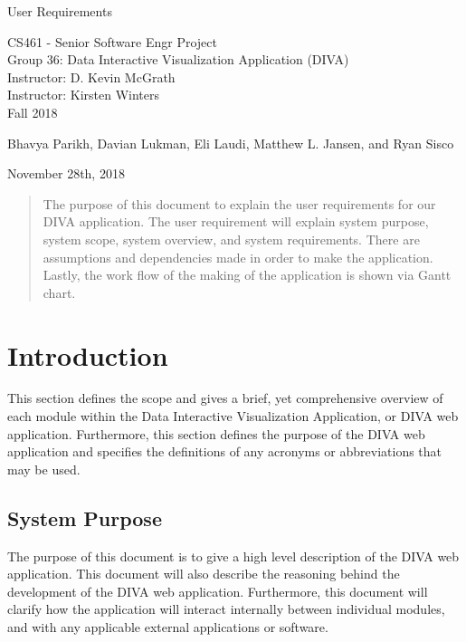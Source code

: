 \documentclass[journal,10pt,onecolumn,compsoc]{IEEEtran} \usepackage[margin=1.0in]{geometry} \usepackage{pdfpages}
\begin{document}
\begin{center}
  
  \textbf{}

  \vspace{4cm}
  \Huge{}
  User Requirements
  \vspace{1.5cm}

 
  \LARGE
  CS461 - Senior Software Engr Project\\
  \vspace{0.25cm}
  Group 36: Data Interactive Visualization Application (DIVA)\\
  Instructor: D. Kevin McGrath \\
  Instructor: Kirsten Winters \\
  \vspace{0.25cm}
  Fall 2018 \\
  \vspace{1.5cm}
  
  \large{Bhavya Parikh, Davian Lukman, Eli Laudi, Matthew L. Jansen, and Ryan Sisco}\\
  \date{October 18th, 2018}
  \vfill
  November 28th, 2018\\
  \vspace{1cm}
  \vspace*{\fill}
   \begin{abstract}
      The purpose of this document to explain the user requirements for our DIVA application. The user requirement will explain system purpose, system scope, system overview, and system requirements. There are assumptions and dependencies made in order to make the application. Lastly, the work flow of the making of the application is shown via Gantt chart.
       \noindent 
   \end{abstract}
   \normalsize 
  \end{center}
\newpage
\tableofcontents
\newpage
  
\section{Introduction}
\noindent This section defines the scope and gives a brief, yet comprehensive overview of each module within the Data Interactive Visualization Application, or DIVA web application. Furthermore, this section defines the purpose of the DIVA web application and specifies the definitions of any acronyms or abbreviations that may be used.

    \subsection{System Purpose}
    \noindent The purpose of this document is to give a high level description of the DIVA web application. This document will also describe the reasoning behind the development of the DIVA web application. Furthermore, this document will clarify how the application will interact internally between individual modules, and with any applicable external applications or software. 
\end{document}
